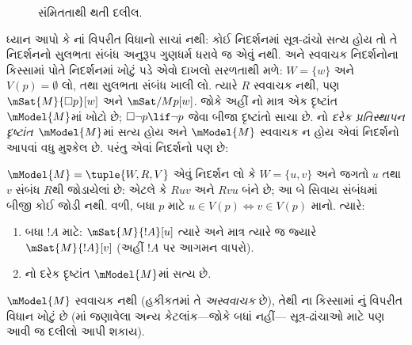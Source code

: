 \begin{figure}
  \begin{center}
  \end{center}
\caption{સંમિતતાથી થતી દલીલ.}
\end{figure}

ધ્યાન આપો કે નાં વિપરીત
વિધાનો સાચાં નથી: કોઈ નિદર્શનમાં સૂત્ર-ઢાંચો
સત્ય હોય તો તે નિદર્શનનો સુલભતા સંબંધ અનુરૂપ
ગુણધર્મ ધરાવે જ એવું નથી.  અને સ્વવાચક
નિદર્શનોના કિસ્સામાં  પોતે નિદર્શનમાં ખોટું
પડે એવો દાખલો સરળતાથી મળે: $W = \{w\}$ અને
$V(p) = \emptyset$ લો, તથા સુલભતા સંબંધ ખાલી લો.
ત્યારે $R$ સ્વવાચક નથી, પણ
$\mSat{M}{\Box
  p}[w]$ અને $\mSat/{M}{p}[w]$. જોકે અહીં
નો માત્ર એક દૃષ્ટાંત~$\mModel{M}$માં
ખોટો છે; $\Box \lnot p \lif \lnot p$ જેવા
બીજા દૃષ્ટાંતો સાચા છે. નો
\emph{દરેક પ્રતિસ્થાપન દૃષ્ટાંત}~$\mModel{M}$માં
સત્ય હોય અને $\mModel{M}$ સ્વવાચક ન હોય એવાં
નિદર્શનો આપવાં વધુ મુશ્કેલ છે. પરંતુ એવાં
નિદર્શનો પણ છે:

\begin{prop}
  $\mModel{M} = \tuple{W, R, V}$ એવું નિદર્શન
  લો કે $W = \{u, v
  \}$ અને જગતો $u$ તથા $v$ સંબંધ $R$થી
  જોડાયેલાં છે: એટલે કે $Ruv$ અને $Rvu$ બંને છે;
  આ બે સિવાય સંબંધમાં બીજી કોઈ જોડી નથી.
  વળી, બધા $p$ માટે $u \in V(p) \Leftrightarrow v
  \in V(p)$ માનો. ત્યારે:
  \begin{enumerate}
  \item બધા $!A$ માટે: $\mSat{M}{!A}[u]$ ત્યારે અને માત્ર ત્યારે
    જ જ્યારે $\mSat{M}{!A}[v]$ (અહીં $!A$ પર આગમન વાપરો).
  \item {}નો દરેક દૃષ્ટાંત $\mModel{M}$માં સત્ય છે.
  \end{enumerate}
  $\mModel{M}$ સ્વવાચક નથી (હકીકતમાં તે
  \emph{અસ્વવાચક} છે), તેથી ના કિસ્સામાં
  નું વિપરીત વિધાન ખોટું છે
  (માં જણાવેલા અન્ય કેટલાંક---જોકે બધાં નહીં---
  સૂત્ર-ઢાંચાઓ માટે પણ આવી જ દલીલો આપી શકાય).
\end{prop}

